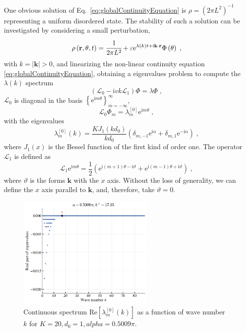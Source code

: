 \documentclass{article}
\begin{document}
One obvious solution of Eq.~\eqref{eq:globalContinuityEquation} is $\rho=(2\pi L^2)^{-1}$ representing a uniform disordered state. The stability of such a solution can be investigated by considering a small perturbation,
\begin{eqnarray}
    \rho \left( \mathbf{r},\theta ,t \right) =\cfrac{1}{2\pi L^2}+\varepsilon \mathrm{e}^{\lambda \left( k \right) t+\mathrm{i}\mathbf{k}\cdot \mathbf{r}}\Phi \left( \theta \right) \;,
\end{eqnarray}
with $k=\left| \mathbf{k} \right|>0$, and linearizing the non-linear continuity equation \eqref{eq:globalContinuityEquation}, obtaining a eigenvalues problem to compute the $\lambda(k)$ spectrum
\begin{equation}
    \left( \mathcal{L} _0-\mathrm{i}vk\mathcal{L} _1 \right) \Phi =\lambda \Phi \;,
\end{equation}
$\mathcal{L}_0$ is diagonal in the basis $\left\{ \mathrm{e}^{\mathrm{i}m\theta} \right\} _{m=-\infty}^{\infty}$,
\begin{equation}
    \mathcal{L} _0\Phi _m=\lambda _{m}^{\left[ 0 \right]}\mathrm{e}^{\mathrm{i}m\theta}\;,
\end{equation}
with the eigenvalues
\begin{equation}
    \lambda _{m}^{\left[ 0 \right]}\left( k \right) =\frac{KJ_1\left( kd_0 \right)}{kd_0}\left( \delta _{m,-1}\mathrm{e}^{\mathrm{i}\alpha}+\delta _{m,1}\mathrm{e}^{-\mathrm{i}\alpha} \right)  \;,
\end{equation}
where $J_1\left( x \right)$ is the Bessel function of the first kind of order one. The operator $\mathcal{L}_1$ is defined as
\begin{equation}
    \mathcal{L} _1\mathrm{e}^{\mathrm{i}m\theta}=\frac{1}{2}\left( \mathrm{e}^{\mathrm{i}\left( m+1 \right) \theta -\mathrm{i}\vartheta}+\mathrm{e}^{\mathrm{i}\left( m-1 \right) \theta +\mathrm{i}\vartheta} \right)  \;,
\end{equation}
where $\vartheta$ is the forms $\mathbf{k}$ with the $x$ axis. Without the loss of generality, we can define the $x$ axis parallel to $\mathbf{k}$, and, therefore, take $\vartheta = 0$.

\begin{figure}[H]
    \centering
    \includegraphics[width=0.6\textwidth]{./figs/continuous_spectrum.pdf}
    \caption{
        Continuous spectrum $\mathrm{Re}[ \lambda _{m}^{\left[ 0 \right]}\left( k \right) ]$ as a function of wave number $k$ for $K=20, d_0=1, alpha=0.5009\pi$.
    }
\end{figure}
\end{document}
